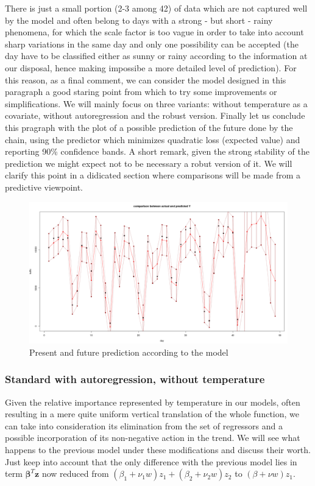 \documentclass[11pt,twoside]{report}
\begin{document}
There is just a small portion (2-3 among 42) of data which are not captured well by the model and often belong to days with a strong - but short - rainy phenomena, for which the scale factor is too vague in order to take into account sharp variations in the same day and only one possibility can be accepted (the day have to be classified either as sunny or rainy according to the information at our disposal, hence making impossibe a more detailed level of prediction). For this reason, as a final comment, we can consider the model designed in this paragraph a good staring point from which to try some improvements or simplifications. We will mainly focus on three variants: without temperature as a covariate, without autoregression and the robust version. Finally let us conclude this pragraph with the plot of a possible prediction of the future done by the chain, using the predictor which minimizes quadratic loss (expected value) and reporting 90\% confidence bands. A short remark, given the strong stability of the prediction we might expect not to be necessary a robut version of it. We will clarify this point in a didicated section where comparisons will be made from a predictive viewpoint.

\begin{figure}[H]
	\centering
	\includegraphics[width=150 mm]{pictures/m1_future.png}
	\caption{Present and future prediction according to the model}
	\label{fig:M1_future}
\end{figure}

\subsubsection{Standard with autoregression, without temperature}
Given the relative importance represented by temperature in our models, often resulting in a mere quite uniform vertical translation of the whole function, we can take into consideration its elimination from the set of regressors and a possible incorporation of its non-negative action in the trend. We will see what happens to the previous model under these modifications and discuss their worth. Just keep into account that the only difference with the previous model lies in term $ \boldsymbol{\beta}^T\mathbf{z} $ now reduced from $ (\beta_1+\nu_1w)z_1 + (\beta_2+\nu_2w)z_2$ to $(\beta+\nu w)z_1$.
\end{document}
